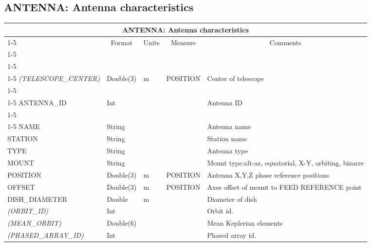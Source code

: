 \documentclass{article}
\newcommand{\defline}[1]{\cline{1-5}
\multicolumn{5}{|l|}{#1} \\
\cline{1-5}}
\newcommand{\definetable}[2]
{
	\vfill\newpage
	\subsection{#1}
        \vspace{0.15in}
        \small
	\begin{tabular}{|l|p{1.25in}|l|p{.9in}|p{1.4in}|}
	\hline
	\multicolumn{5}{|c|}{\bf #1}\\ 
	\cline{1-5}
        \multicolumn{1}{|c|}{Name}&\multicolumn{1}{|c|}{Format}&
        \multicolumn{1}{|c|}{Units}&\multicolumn{1}{|c|}{Measure}&
        \multicolumn{1}{|c|}{Comments}\\
        \cline{1-5}
        #2
        \hline
	\end{tabular}
}
\begin{document}
\definetable{ANTENNA: Antenna characteristics}
{
\defline{\bf Columns}
\defline{\em Keywords}
{\it (TELESCOPE\_CENTER)} & Double(3) & m & POSITION & Center of telescope\\
\defline{\em Key}
ANTENNA\_ID & Int & & & Antenna ID \\
\defline{\em Data}
NAME &       String &  & &  Antenna name \\
STATION &        String & & &  Station name \\
TYPE  &  String &     &      & Antenna type \\
MOUNT  & String &  & &   Mount type:alt-az, equatorial, X-Y, orbiting, bizarre \\
POSITION &   Double(3) &  m   &     POSITION &   Antenna X,Y,Z phase reference positions \\
OFFSET & Double(3)  &   m &     POSITION & Axes offset of mount to FEED REFERENCE point \\
DISH\_DIAMETER &  Double &  m  &      & Diameter of dish\\
{\it (ORBIT\_ID)}    &    Int & & &  Orbit id. \\
{\it (MEAN\_ORBIT)}  &    Double(6) & & & Mean Keplerian elements\\
{\it (PHASED\_ARRAY\_ID)} & Int   &  & &   Phased array id.\\
}
\end{document}
